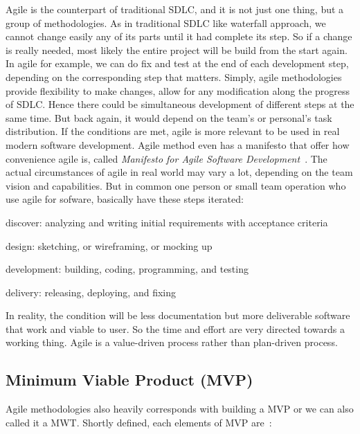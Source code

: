 Agile is the counterpart of traditional \ac{SDLC}, and it is not just one thing, but a group of methodologies.
As in traditional \ac{SDLC} like waterfall approach, we cannot change easily any of its parts until it had complete its step.
So if a change is really needed, most likely the entire project will be build from the start again.
In agile for example, we can do fix and test at the end of each development step, depending on the corresponding step that matters.
Simply, agile methodologies provide flexibility to make changes, allow for any modification along the progress of \ac{SDLC}.
Hence there could be simultaneous development of different steps at the same time.
But back again, it would depend on the team's or personal's task distribution.
If the conditions are met, agile is more relevant to be used in real modern software development.
Agile method even has a manifesto that offer how convenience agile is, called \textit{Manifesto for Agile Software Development}~\autocite{Beck2001Manifesto}.
The actual circumstances of agile in real world may vary a lot, depending on the team vision and capabilities.
But in common one person or small team operation who use agile for sofware, basically have these steps iterated:
\begin{inparaenum}
\item discover: analyzing and writing initial requirements with acceptance criteria
\item design: sketching, or wireframing, or mocking up
\item development: building, coding, programming, and testing
\item delivery: releasing, deploying, and fixing
\end{inparaenum}
In reality, the condition will be less documentation but more deliverable software that work and viable to user.
So the time and effort are very directed towards a working thing.
Agile is a value-driven process rather than plan-driven process.

\subsection{Minimum Viable Product (MVP)}

Agile methodologies also heavily corresponds with building a \ac{MVP} or we can also called it a \ac{MWT}. Shortly defined, each elements of \ac{MVP} are~\autocite{Montgomery2013MWT}:

